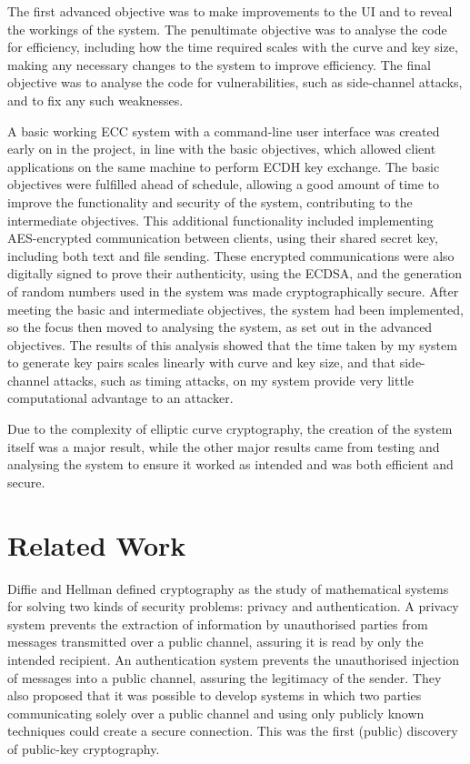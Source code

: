 \documentclass[12pt,a4paper]{article}
\begin{document}
The first advanced objective was to make improvements to the UI and to reveal the workings of the system. 
The penultimate objective was to analyse the code for efficiency, 
including how the time required scales with the curve and key size, 
making any necessary changes to the system to improve efficiency. 
The final objective was to analyse the code for vulnerabilities, such as side-channel attacks, 
and to fix any such weaknesses. 

A basic working ECC system with a command-line user interface was created early on in the project, 
in line with the basic objectives, 
which allowed client applications on the same machine to perform ECDH key exchange. 
The basic objectives were fulfilled ahead of schedule, 
allowing a good amount of time to improve the functionality and security of the system, contributing to the intermediate objectives. 
This additional functionality included implementing AES-encrypted communication between clients, 
using their shared secret key, including both text and file sending. 
These encrypted communications were also digitally signed to prove their authenticity, using the ECDSA, 
and the generation of random numbers used in the system was made cryptographically secure. 
After meeting the basic and intermediate objectives, the system had been implemented, 
so the focus then moved to analysing the system, as set out in the advanced objectives. 
The results of this analysis showed that the time taken by my system to generate key pairs scales linearly with curve and key size, and that side-channel attacks, such as timing attacks, on my system provide very little computational advantage to an attacker. 

Due to the complexity of elliptic curve cryptography, the creation of the system itself was a major result, while the other major results came from testing and analysing the system to ensure it worked as intended and was both efficient and secure. 


\section{Related Work} \noindent
Diffie and Hellman \citeyear{1055638} defined cryptography as the study of 
mathematical systems for solving two kinds of security problems: privacy and authentication. 
A privacy system prevents the extraction of information by unauthorised parties from messages transmitted over a public channel, 
assuring it is read by only the intended recipient. 
An authentication system prevents the unauthorised injection of messages into a public channel, assuring the legitimacy of the sender. 
They also proposed that it was possible to develop systems in which two parties 
communicating solely over a public channel and using only publicly known techniques could create a secure connection. 
This was the first (public) discovery of public-key cryptography. 
\end{document}
